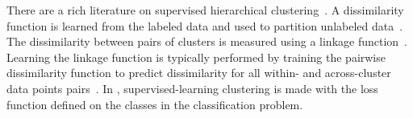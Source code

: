 There are a rich literature on supervised hierarchical
clustering~\cite{pmlr-v97-yadav19a,finley-icml05,liu13,GuhaIBB15,kenyon-dean-etal-2018-resolving,tie19}. A
dissimilarity function is learned from the labeled data and used
to partition unlabeled data~\cite{finley-icml05}. The dissimilarity
between pairs of clusters is measured using a linkage
function~\cite{moseley-nips17,GuhaIBB15,pmlr-v97-yadav19a,lee-etal-2012-joint}. Learning
the linkage function is typically performed by training the pairwise
dissimilarity function to predict dissimilarity for all within- and
across-cluster data points
pairs~\cite{pmlr-v97-yadav19a,kenyon-dean-etal-2018-resolving}. In
{\tool}, supervised-learning clustering is made with the loss function
defined on the classes in the classification problem.

